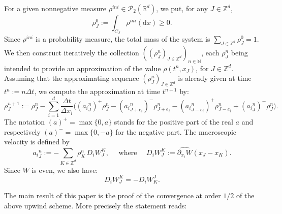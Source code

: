 \documentclass[11pt]{article}
\theoremstyle{definition}
\numberwithin{equation}{section}
\newcommand*{\dd}{\mathrm{d}}
\newcommand*{\dx}{\dd x}
\newcommand*\RR{\mathbb{R}}
\newcommand*\ZZ{\mathbb{Z}}
\newcommand*\pa{\partial}
\newcommand*\calP{{\mathcal P}}
\begin{document}
For a given nonnegative measure $\rho^{ini}\in
\calP_2(\RR^d)$, we put, for any $J\in \ZZ^d$,
\begin{equation}\label{disrho0}
\rho_{J}^0:= \int_{C_J} \rho^{ini}(\dx)\geq 0.
\end{equation}
Since $\rho^{ini}$ is a probability measure, the total mass of the system is $\sum_{J\in \ZZ^d} \rho_{J}^0 = 1$. We then construct iteratively the collection $((\rho_J^n)_{J \in \ZZ^d})_{n \in {\mathbb N}}$, each $\rho^n_{J}$ being intended to provide an approximation of the value $\rho(t^n,x_J)$, for $J\in \ZZ^d$. Assuming that the approximating sequence $(\rho_{J}^n)_{J\in \ZZ^d}$ is already given at time $t^n:=n \Delta t$, we compute the approximation at time $t^{n+1}$ by:
\begin{equation}\label{dis_num}
 \rho_{J}^{n+1} :=  \rho_{J}^n - \sum_{i=1}^{d} \frac{\Delta t}{\Delta x_i}
\Big(({a_i}^n_{J})^+ \rho_{J}^n - ({a_i}^n_{J+e_i})^- \rho_{J+e_i}^n -({a_i}^n_{J-e_i})^+ \rho_{J-e_i}^n + ({a_i}^n_{J})^- \rho_{J}^n \Big).
\end{equation}
The notation $(a)^+ = \max\{0,a\}$ stands for the positive part of the real $a$ and respectively $(a)^- = \max\{0,-a\}$ for the negative part. The macroscopic velocity is defined by
\begin{equation}\label{def:aij}
{a_i}^n_{J} := -\sum_{K\in \ZZ^d} \rho_{K}^n \,D_iW_J^K,
\quad \text{ where } \quad D_iW_J^K := \widehat{\pa_{x_i} W}(x_J-x_K).
\end{equation}
Since $W$ is even, we also have:
\begin{equation}\label{eq:gradients:symmetry:cells}
D_iW_{J}^{K} = -D_iW^{J}_{K}.
\end{equation}

The main result of this paper is the proof of the convergence at order $1/2$ of the above upwind scheme. More precisely the statement reads:
\end{document}
